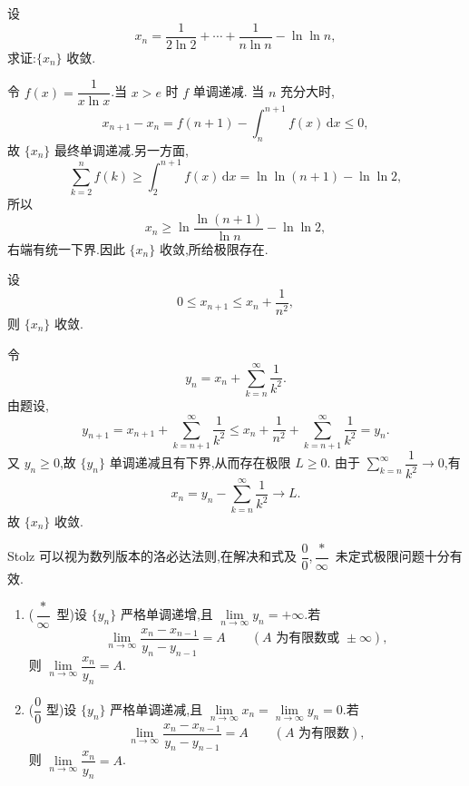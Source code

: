 \begin{example}
  设
  \[
    x_n=\dfrac{1}{2\ln2}+\cdots+\dfrac{1}{n\ln n}-\ln\ln n,
  \]
  求证:$\{x_n\}$ 收敛.
\end{example}
\exampleblank

\begin{solution}
  令 $f(x)=\dfrac{1}{x\ln x}$.当 $x>e$ 时 $f$ 单调递减.
  当 $n$ 充分大时,
  \[
    x_{n+1}-x_n
    =f(n+1)-\int_n^{n+1}f(x)\,\mathrm{d}x\leq0,
  \]
  故 $\{x_n\}$ 最终单调递减.另一方面,
  \[
    \displaystyle\sum\limits_{k=2}^n f(k)
    \geq\int_2^{n+1}f(x)\,\mathrm{d}x
    =\ln\ln(n+1)-\ln\ln2,
  \]
  所以
  \[
    x_n\geq\ln\dfrac{\ln(n+1)}{\ln n}-\ln\ln2,
  \]
  右端有统一下界.因此 $\{x_n\}$ 收敛,所给极限存在.
\end{solution}

\begin{example}
  设
  \[
    0\leq x_{n+1}\leq x_n+\dfrac{1}{n^2},
  \]
  则 $\{x_n\}$ 收敛.
\end{example}
\exampleblank

\begin{solution}
  令
  \[
    y_n=x_n+\sum\limits_{k=n}^{\infty}\dfrac{1}{k^2}.
  \]
  由题设,
  \[
    y_{n+1}
    =x_{n+1}+\sum\limits_{k=n+1}^{\infty}\dfrac{1}{k^2}
    \leq x_n+\dfrac{1}{n^2}+\sum\limits_{k=n+1}^{\infty}\dfrac{1}{k^2}
    =y_n.
  \]
  又 $y_n\geq0$,故 $\{y_n\}$ 单调递减且有下界,从而存在极限 $L\geq0$.
  由于 $\displaystyle \sum\limits_{k=n}^{\infty}\dfrac{1}{k^2}\to0$,有
  \[
    x_n=y_n-\sum\limits_{k=n}^{\infty}\dfrac{1}{k^2}\longrightarrow L.
  \]
  故 $\{x_n\}$ 收敛.
\end{solution}




Stolz 可以视为数列版本的洛必达法则,在解决和式及 $\dfrac{0}{0}$,$\dfrac{*}{\infty}$ 未定式极限问题十分有效.

\begin{theorem}
  \leavevmode
  \begin{enumerate}
    \item ($\dfrac{*}{\infty}$ 型)设 $\{y_n\}$ 严格单调递增,且
          $\displaystyle \lim\limits_{n\to\infty}y_n=+\infty$.若
          \[
            \displaystyle\lim\limits_{n\to\infty}
            \dfrac{x_n-x_{n-1}}{y_n-y_{n-1}}=A
            \qquad(A\text{ 为有限数或 }\pm\infty),
          \]
          则 $\displaystyle \lim\limits_{n\to\infty}\dfrac{x_n}{y_n}=A$.
    \item ($\dfrac{0}{0}$ 型)设 $\{y_n\}$ 严格单调递减,且
          $\displaystyle \lim\limits_{n\to\infty}x_n
          =\lim\limits_{n\to\infty}y_n=0$.若
          \[
            \displaystyle\lim\limits_{n\to\infty}
            \dfrac{x_n-x_{n-1}}{y_n-y_{n-1}}=A
            \qquad(A\text{ 为有限数}),
          \]
          则 $\displaystyle \lim\limits_{n\to\infty}\dfrac{x_n}{y_n}=A$.
  \end{enumerate}
\end{theorem}

